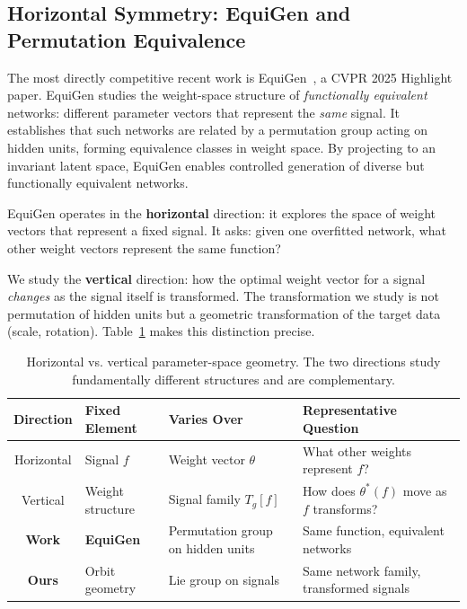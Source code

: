 \subsection{Horizontal Symmetry: EquiGen and Permutation Equivalence}

The most directly competitive recent work is EquiGen~\citep{peignier2023equigen}, a CVPR 2025 Highlight paper.
EquiGen studies the weight-space structure of \emph{functionally equivalent} networks: different parameter vectors that represent the \emph{same} signal.
It establishes that such networks are related by a permutation group acting on hidden units, forming equivalence classes in weight space.
By projecting to an invariant latent space, EquiGen enables controlled generation of diverse but functionally equivalent networks.

EquiGen operates in the \textbf{horizontal} direction: it explores the space of weight vectors that represent a fixed signal.
It asks: given one overfitted network, what other weight vectors represent the same function?

We study the \textbf{vertical} direction: how the optimal weight vector for a signal \emph{changes} as the signal itself is transformed.
The transformation we study is not permutation of hidden units but a geometric transformation of the target data (scale, rotation).
Table~\ref{tab:horizontal_vs_vertical} makes this distinction precise.

\begin{table}[t]
    \centering
    \caption{Horizontal vs. vertical parameter-space geometry.
    The two directions study fundamentally different structures and are complementary.}
    \label{tab:horizontal_vs_vertical}
    \begin{tabular}{clll}
        \toprule
        Direction & Fixed Element & Varies Over & Representative Question \\
        \midrule
        Horizontal & Signal $f$ & Weight vector $\theta$ & What other weights represent $f$? \\
        Vertical & Weight structure & Signal family $T_g[f]$ & How does $\theta^*(f)$ move as $f$ transforms? \\
        \midrule
        \textbf{Work} & \textbf{EquiGen} & Permutation group on hidden units & Same function, equivalent networks \\
        \textbf{Ours} & Orbit geometry & Lie group on signals & Same network family, transformed signals \\
        \bottomrule
    \end{tabular}
\end{table}

